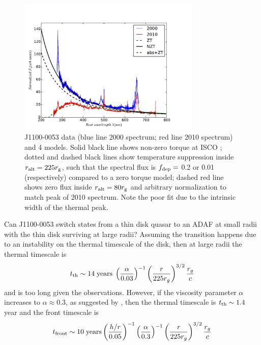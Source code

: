 \documentclass[a4paper,fleqn,usenatbib]{mnras}
\begin{document}
\begin{figure}
  \centering
\includegraphics[width=8.7cm, trim=0.2cm 0.2cm 1.4cm 0.6cm, clip]
{../plots/models/mcd_gap_v3_3_b1.pdf}
\vspace{-12pt}
  \caption[]{
J1100-0053 data (blue line 2000 spectrum; red line 2010 spectrum) and
4 models. Solid black line shows non-zero torque at ISCO
\citep[following] []{Afshordi_Paczynski2003}; dotted and dashed black
lines show temperature suppression inside $r_{\rm alt} = 225 r_{\rm
g}$, such that the spectral flux is $f_{\rm dep} = $ 0.2 or 0.01
(respectively) compared to a zero torque model; dashed red line shows
zero flux inside $r_{\rm alt} = 80 r_{\rm g}$ and arbitrary
normalization to match peak of 2010 spectrum. Note the poor fit due to
the intrinsic width of the thermal peak.
  }
  \label{fig:disk_suppression}
\end{figure}
Can J1100-0053 switch states from a thin disk quasar to an ADAF at small
radii with the thin disk surviving at large radii?  Assuming the
transition happens due to an instability on the thermal timescale of
the disk, then at large radii the thermal timescale is
\begin{equation}
    t_{\rm th} \sim 14 \; {\rm years} \; \left(\frac{\alpha}{0.03}\right)^{-1}
                                                \left(\frac{r}{225r_{g}}\right)^{3/2} 
                                                        \frac{r_{g}}{c}
\end{equation} 
and is too long given the observations. However, if the viscosity
parameter $\alpha$ increases to $\alpha \approx 0.3$, as suggested by
\citet{King2007}, then the thermal timescale is $t_{\rm th} \sim 1.4$
year and the front timescale is
\begin{equation}
    t_{\rm front}  \sim  10 \; {\rm years} \left(\frac{h/r}{0.05}\right)^{-1}
                                                           \left(\frac{\alpha}{0.3}\right)^{-1}  
                                                           \left(\frac{r}{225r_{g}}\right)^{3/2}  
                                                           \frac{r_{g}}{c}
\label{eqn:t_front}
\end{equation}
\end{document}
